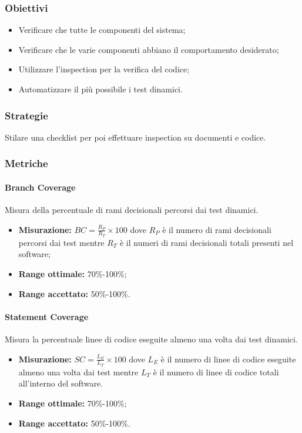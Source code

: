 		\subsubsection{Obiettivi}
		\begin{itemize}
			\item Verificare che tutte le componenti del sistema;
			\item Verificare che le varie componenti abbiano il comportamento desiderato;
			\item Utilizzare l'inspection per la verifica del codice;
			\item Automatizzare il più possibile i test dinamici.
		\end{itemize}
		\subsubsection{Strategie}
		Stilare una checklist per poi effettuare inspection su documenti e codice.
		\subsubsection{Metriche}
			\paragraph{Branch Coverage} 
			Misura della percentuale di rami decisionali percorsi dai test dinamici.
			\begin{itemize}
				\item \textbf{Misurazione:} $BC=\frac{R_P}{R_T}\times 100$ dove $R_P$ è il numero di rami decisionali percorsi dai test mentre $R_T$ è il numeri di rami decisionali totali presenti nel software;
				\item \textbf{Range ottimale:} 70\%-100\%;
				\item \textbf{Range accettato:} 50\%-100\%.
		    \end{itemize}
			\paragraph{Statement Coverage}
			Misura la percentuale linee di codice eseguite almeno una volta dai test dinamici.
				\begin{itemize}
					\item \textbf{Misurazione:} $SC=\frac{L_E}{L_T}\times 100$ dove $L_E$ è il numero di linee di codice eseguite almeno una volta dai test mentre $L_T$ è il numero di linee di codice totali all'interno del software.
					\item \textbf{Range ottimale:} 70\%-100\%;
					\item \textbf{Range accettato:} 50\%-100\%.
		    	\end{itemize}
